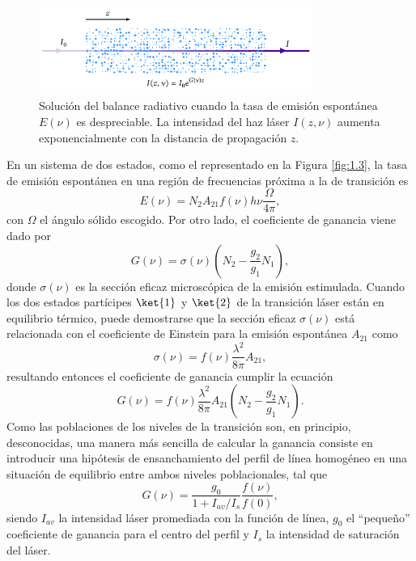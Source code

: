 \begin{figure}[htbp]
  \centering
  \includegraphics[width=0.8\textwidth]{Figuras/ch1_lambeer.pdf}
  \caption{Solución del balance radiativo cuando la tasa de emisión espontánea $E(\nu)$ es despreciable. La intensidad del haz láser $I(z,\nu)$ aumenta exponencialmente con la distancia de propagación $z$.}
  \label{fig:1.6}
\end{figure}

En un sistema de dos estados, como el representado en la Figura \ref{fig:1.3}, la tasa de emisión espontánea en una región de frecuencias próxima a la de transición es \autocite{Tallents2003}
\begin{equation}\label{eq:1.18}
  E(\nu) = N_{2}A_{21}f(\nu)h \nu\frac{\Omega}{4 \pi},
\end{equation}
con $\Omega$ el ángulo sólido escogido. Por otro lado, el coeficiente de ganancia viene dado por
\begin{equation}\label{eq:1.19}
  G(\nu) = \sigma(\nu)\left(N_{2}-\frac{g_{2}}{g_{1}}N_{1}\right),
\end{equation}
donde $\sigma(\nu)$ es la sección eficaz microscópica de la emisión estimulada. Cuando los dos estados partícipes $\ket{1}$ y $\ket{2}$ de la transición láser están en equilibrio térmico, puede demostrarse que la sección eficaz $\sigma(\nu)$ está relacionada con el coeficiente de Einstein para la emisión espontánea $A_{21}$ como \autocite{Tallents2003}
\begin{equation}\label{eq:1.20}
  \sigma(\nu) = f(\nu)\frac{\lambda^{2}}{8 \pi}A_{21},
\end{equation}
resultando entonces el coeficiente de ganancia cumplir la ecuación
\begin{equation}\label{eq:1.21}
  G(\nu) = f(\nu)\frac{\lambda^{2}}{8 \pi}A_{21}\left(N_{2}-\frac{g_{2}}{g_{1}}N_{1}\right).
\end{equation}
Como las poblaciones de los niveles de la transición son, en principio, desconocidas, una manera más sencilla de calcular la ganancia consiste en introducir una hipótesis de ensanchamiento del perfil de línea homogéneo \autocite{Tallents2003} en una situación de equilibrio entre ambos niveles poblacionales, tal que
\begin{equation}\label{eq:1.22}
  G(\nu) = \frac{g_{0}}{1+I_{av}/I_{s}}\frac{f(\nu)}{f(0)},
\end{equation}
siendo $I_{av}$ la intensidad láser promediada con la función de línea, $g_{0}$ el \enquote{pequeño} coeficiente de ganancia para el centro del perfil y $I_{s}$ la intensidad de saturación del láser. 

